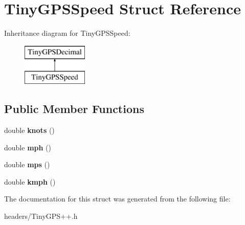 \hypertarget{struct_tiny_g_p_s_speed}{}\section{Tiny\+G\+P\+S\+Speed Struct Reference}
\label{struct_tiny_g_p_s_speed}
Inheritance diagram for Tiny\+G\+P\+S\+Speed\+:\begin{figure}[H]
\begin{center}
\leavevmode
\includegraphics[height=2.000000cm]{struct_tiny_g_p_s_speed}
\end{center}
\end{figure}
\subsection*{Public Member Functions}
\begin{DoxyCompactItemize}
\item 
double {\bfseries knots} ()\hypertarget{struct_tiny_g_p_s_speed_aa3a38ce4ece3d8062c794b73f260395e}{}\label{struct_tiny_g_p_s_speed_aa3a38ce4ece3d8062c794b73f260395e}

\item 
double {\bfseries mph} ()\hypertarget{struct_tiny_g_p_s_speed_a1809120167961ea9a85e860a964b1c6e}{}\label{struct_tiny_g_p_s_speed_a1809120167961ea9a85e860a964b1c6e}

\item 
double {\bfseries mps} ()\hypertarget{struct_tiny_g_p_s_speed_aacee536241e810cdf4ba7846d6c202cb}{}\label{struct_tiny_g_p_s_speed_aacee536241e810cdf4ba7846d6c202cb}

\item 
double {\bfseries kmph} ()\hypertarget{struct_tiny_g_p_s_speed_a7fee3c8f9f2fcc5f4a517bd6108f79dd}{}\label{struct_tiny_g_p_s_speed_a7fee3c8f9f2fcc5f4a517bd6108f79dd}

\end{DoxyCompactItemize}


The documentation for this struct was generated from the following file\+:\begin{DoxyCompactItemize}
\item 
headers/Tiny\+G\+P\+S++.\+h\end{DoxyCompactItemize}
